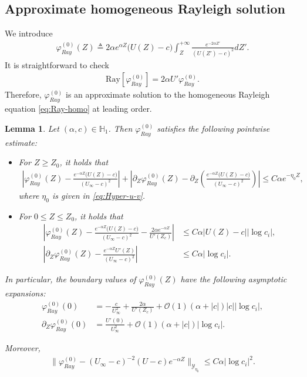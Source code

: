 \documentclass[reqno,11pt]{amsart}
\numberwithin{equation}{section}
\numberwithin{equation}{section}
\theoremstyle{plain}
\newtheorem{lemma}[theorem]{Lemma}
\begin{document}
\subsection{Approximate homogeneous Rayleigh solution}
We introduce 
\begin{align}\label{eq:ray-main-def}
	\varphi_{Ray}^{(0)}(Z)\triangleq2\alpha e^{\alpha Z}\big(U(Z)-c\big)\int_Z^{+\infty}\frac{e^{-2\alpha Z'}}{(U(Z')-c)^2}dZ'.
\end{align}
It is straightforward to check 
\begin{align}\label{eq:airy-0}
	\mathrm{Ray}[\varphi_{Ray}^{(0)}]=2\alpha U'\varphi_{Ray}^{(0)}.
\end{align}
Therefore, $\varphi_{Ray}^{(0)}$ is an approximate solution to the homogeneous Rayleigh equation \eqref{eq:Ray-homo} at leading order. 
\begin{lemma}\label{lem:ray-main}
	Let $(\alpha, c)\in \mathbb{H}_1$. Then $\varphi_{Ray}^{(0)}$  satisfies the following pointwise estimate:
	\begin{itemize}
		\item[(a)] For $Z\geq Z_0$, it holds that
		\begin{align}
			\left|\varphi_{Ray}^{(0)}(Z)-\frac{e^{-\alpha Z}\big(U(Z)-c\big)}{(U_\infty-c)^2}\right|+\left|\partial_Z\varphi_{Ray}^{(0)}(Z)-\partial_Z\left(\frac{e^{-\alpha Z}\big(U(Z)-c\big)}{(U_\infty-c)^2}\right) \right|\leq C\alpha e^{-\eta_0 Z},\label{p1}
		\end{align}
	where $\eta_0$ is given in \eqref{eq:Hyper-u-v}.
		\item[(b)] For $0\leq Z\leq Z_0$, it holds that
		\begin{align}
			\left|\varphi_{Ray}^{(0)}(Z)-\frac{e^{-\alpha Z}\big(U(Z)-c\big)}{(U_\infty-c)^2}-\frac{2\alpha e^{-\alpha Z}}{U'(Z_c)} \right|&\leq C\alpha|U(Z)-c||\log c_i|,\label{p2}\\
			\left|\partial_Z\varphi_{Ray}^{(0)}(Z)-\frac{e^{-\alpha Z}U'(Z)}{(U_\infty-c)^2} \right|&\leq C\alpha|\log c_i|.\label{p3}
		\end{align}
	\end{itemize} 
	
	In particular, the boundary values of $\varphi_{Ray}^{(0)}(Z)$ have the following asymptotic expansions:
	\begin{align}
		\varphi_{Ray}^{(0)}(0)&=-\frac{c}{U_\infty^2}+\frac{2\alpha }{U'(Z_c)} +\mathcal{O}(1)(\alpha+|c|)|c||\log c_i|,\label{bc1}\\
		\partial_Z\varphi_{Ray}^{(0)}(0)&=\frac{U'(0)}{U_\infty^2}+\mathcal{O}(1)(\alpha+|c|)|\log c_i|.\label{bc2}
	\end{align}
	
	Moreover, %
	\begin{align}\label{eq-lem-ray-sub-profile}
		\big\|\varphi_{Ray}^{(0)}-(U_\infty-c)^{-2}(U-c)e^{-\alpha Z}\big\|_{\mathcal{Y}_{\eta_0}}\leq C\alpha|\log c_i|^2.
	\end{align}
\end{lemma}
\end{document}
